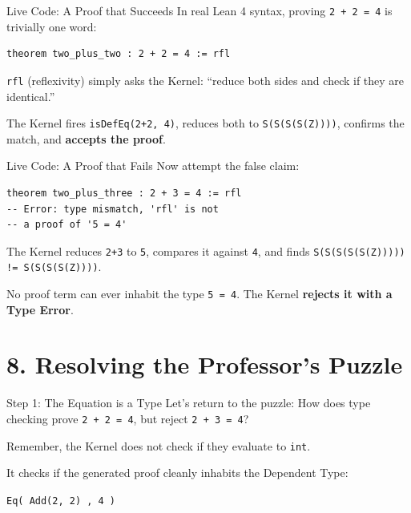 \documentclass[10pt,aspectratio=169]{beamer}
\begin{document}
\begin{frame}[fragile]{Live Code: A Proof that Succeeds}
    In real Lean 4 syntax, proving \verb|2 + 2 = 4| is trivially one word:
    
    \begin{lstlisting}[language={}]
theorem two_plus_two : 2 + 2 = 4 := rfl
    \end{lstlisting}
    
    \verb|rfl| (reflexivity) simply asks the Kernel: ``reduce both sides and check if they are identical.''
    
    \vspace{1em}
    The Kernel fires \verb|isDefEq(2+2, 4)|, reduces both to \verb|S(S(S(S(Z))))|, confirms the match, and \textbf{accepts the proof}.
\end{frame}

\begin{frame}[fragile]{Live Code: A Proof that Fails}
    Now attempt the false claim:
    
    \begin{lstlisting}[language={}]
theorem two_plus_three : 2 + 3 = 4 := rfl
-- Error: type mismatch, 'rfl' is not
-- a proof of '5 = 4'
    \end{lstlisting}
    
    The Kernel reduces \verb|2+3| to \verb|5|, compares it against \verb|4|, and finds \verb|S(S(S(S(S(Z))))) != S(S(S(S(Z))))|.
    
    \vspace{1em}
    No proof term can ever inhabit the type \verb|5 = 4|. The Kernel \textbf{rejects it with a Type Error}.
\end{frame}

\section{8. Resolving the Professor's Puzzle}

\begin{frame}[fragile]{Step 1: The Equation is a Type}
    Let's return to the puzzle: How does type checking prove \verb|2 + 2 = 4|, but reject \verb|2 + 3 = 4|?
    
    \vspace{1em}
    Remember, the Kernel does not check if they evaluate to \verb|int|. 
    
    It checks if the generated proof cleanly inhabits the Dependent Type:
    \begin{center}
        \Large \texttt{Eq( Add(2, 2) , 4 )}
    \end{center}
\end{frame}
\end{document}

